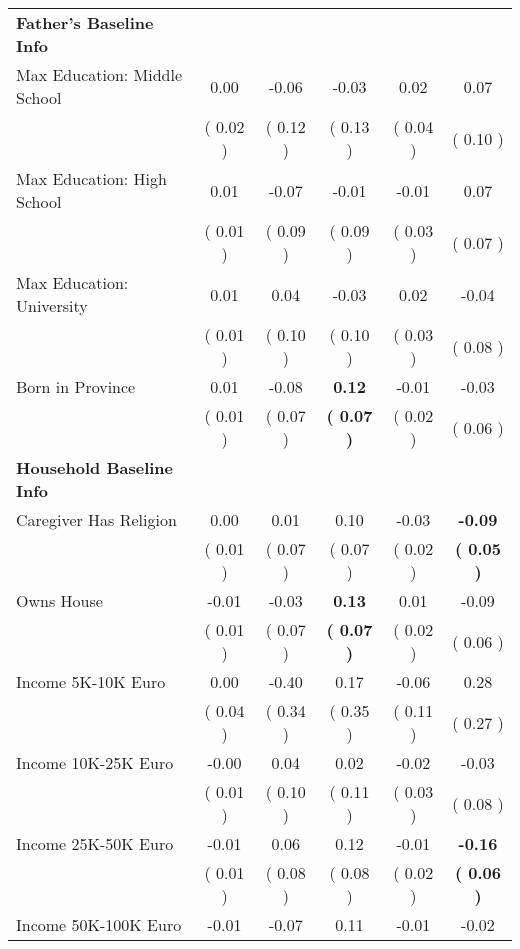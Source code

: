 \begin{table}[H]
{\begin{tabular}{lccccc}
\midrule
\textbf{Father's Baseline Info} \\
\quad Max Education: Middle School &      0.00 &     -0.06 &     -0.03 &      0.02 &      0.07 \\
\quad  & (     0.02 ) & (     0.12 )  & (     0.13 )  & (     0.04 ) & (     0.10 ) \\
\quad Max Education: High School &      0.01 &     -0.07 &     -0.01 &     -0.01 &      0.07 \\
\quad  & (     0.01 ) & (     0.09 )  & (     0.09 )  & (     0.03 ) & (     0.07 ) \\
\quad Max Education: University &      0.01 &      0.04 &     -0.03 &      0.02 &     -0.04 \\
\quad  & (     0.01 ) & (     0.10 )  & (     0.10 )  & (     0.03 ) & (     0.08 ) \\
\quad Born in Province &      0.01 &     -0.08 & \textbf{     0.12} &     -0.01 &     -0.03 \\
\quad  & (     0.01 ) & (     0.07 )  & \textbf{(     0.07 )}  & (     0.02 ) & (     0.06 ) \\
\midrule
\textbf{Household Baseline Info} \\
\quad Caregiver Has Religion &      0.00 &      0.01 &      0.10 &     -0.03 & \textbf{    -0.09} \\
\quad  & (     0.01 ) & (     0.07 )  & (     0.07 )  & (     0.02 ) & \textbf{(     0.05 )} \\
\quad Owns House &     -0.01 &     -0.03 & \textbf{     0.13} &      0.01 &     -0.09 \\
\quad  & (     0.01 ) & (     0.07 )  & \textbf{(     0.07 )}  & (     0.02 ) & (     0.06 ) \\
\quad Income 5K-10K Euro &      0.00 &     -0.40 &      0.17 &     -0.06 &      0.28 \\
\quad  & (     0.04 ) & (     0.34 )  & (     0.35 )  & (     0.11 ) & (     0.27 ) \\
\quad Income 10K-25K Euro &     -0.00 &      0.04 &      0.02 &     -0.02 &     -0.03 \\
\quad  & (     0.01 ) & (     0.10 )  & (     0.11 )  & (     0.03 ) & (     0.08 ) \\
\quad Income 25K-50K Euro &     -0.01 &      0.06 &      0.12 &     -0.01 & \textbf{    -0.16} \\
\quad  & (     0.01 ) & (     0.08 )  & (     0.08 )  & (     0.02 ) & \textbf{(     0.06 )} \\
\quad Income 50K-100K Euro &     -0.01 &     -0.07 &      0.11 &     -0.01 &     -0.02 \\

\end{tabular}}
\end{table}
